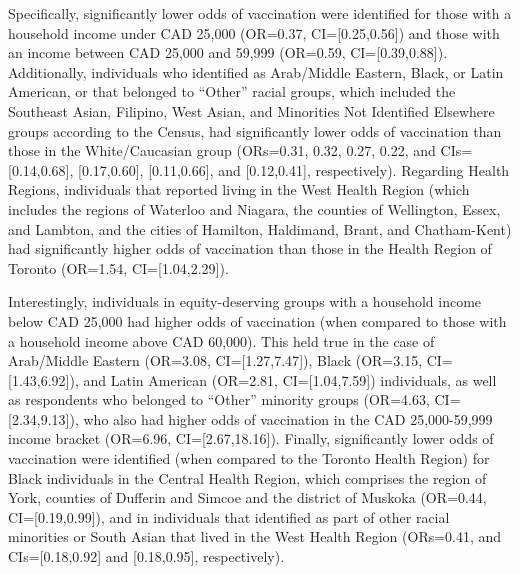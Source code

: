 \documentclass[
  letterpaper,
  DIV=11,
  numbers=noendperiod]{scrartcl}
\begin{document}
Specifically, significantly lower odds of vaccination were identified
for those with a household income under CAD 25,000 (OR=0.37,
CI={[}0.25,0.56{]}) and those with an income between CAD 25,000 and
59,999 (OR=0.59, CI={[}0.39,0.88{]}). Additionally, individuals who
identified as Arab/Middle Eastern, Black, or Latin American, or that
belonged to ``Other'' racial groups, which included the Southeast Asian,
Filipino, West Asian, and Minorities Not Identified Elsewhere groups
according to the Census, had significantly lower odds of vaccination
than those in the White/Caucasian group (ORs=0.31, 0.32, 0.27, 0.22, and
CIs={[}0.14,0.68{]}, {[}0.17,0.60{]}, {[}0.11,0.66{]}, and
{[}0.12,0.41{]}, respectively). Regarding Health Regions, individuals
that reported living in the West Health Region (which includes the
regions of Waterloo and Niagara, the counties of Wellington, Essex, and
Lambton, and the cities of Hamilton, Haldimand, Brant, and Chatham-Kent)
had significantly higher odds of vaccination than those in the Health
Region of Toronto (OR=1.54, CI={[}1.04,2.29{]}).

Interestingly, individuals in equity-deserving groups with a household
income below CAD 25,000 had higher odds of vaccination (when compared to
those with a household income above CAD 60,000). This held true in the
case of Arab/Middle Eastern (OR=3.08, CI={[}1.27,7.47{]}), Black
(OR=3.15, CI={[}1.43,6.92{]}), and Latin American (OR=2.81,
CI={[}1.04,7.59{]}) individuals, as well as respondents who belonged to
``Other'' minority groups (OR=4.63, CI={[}2.34,9.13{]}), who also had
higher odds of vaccination in the CAD 25,000-59,999 income bracket
(OR=6.96, CI={[}2.67,18.16{]}). Finally, significantly lower odds of
vaccination were identified (when compared to the Toronto Health Region)
for Black individuals in the Central Health Region, which comprises the
region of York, counties of Dufferin and Simcoe and the district of
Muskoka (OR=0.44, CI={[}0.19,0.99{]}), and in individuals that
identified as part of other racial minorities or South Asian that lived
in the West Health Region (ORs=0.41, and CIs={[}0.18,0.92{]} and
{[}0.18,0.95{]}, respectively).
\end{document}
